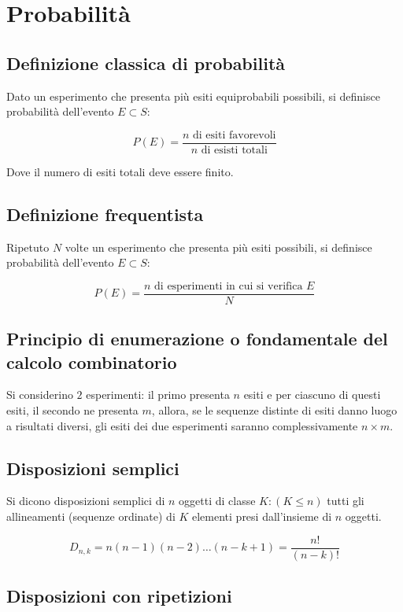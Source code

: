 \documentclass{article}
\begin{document}
\section{Probabilità}

\subsection{Definizione classica di probabilità}

Dato un esperimento che presenta più esiti equiprobabili possibili, si definisce probabilità dell'evento $E \subset S$:

$$
P(E) = \frac{n \text{ di esiti favorevoli}}{n \text{ di esisti totali}}
$$

\noindent
Dove il numero di esiti totali deve essere finito.

\subsection{Definizione frequentista}

Ripetuto $N$ volte un esperimento che presenta più esiti possibili, si definisce probabilità dell'evento $E \subset S$:

$$
P(E) = \frac{n \text{ di esperimenti in cui si verifica } E}{N}
$$

\subsection{Principio di enumerazione o fondamentale del calcolo combinatorio}

Si considerino $2$ esperimenti:
il primo presenta $n$ esiti e per ciascuno di questi esiti,
il secondo ne presenta $m$, allora, se le sequenze distinte di esiti danno luogo a risultati diversi,
gli esiti dei due esperimenti saranno complessivamente $n \times m$.

\subsection{Disposizioni semplici}

Si dicono disposizioni semplici di $n$ oggetti di classe $K : (K \leq n)$ tutti gli allineamenti (sequenze ordinate) di $K$ elementi presi dall'insieme di $n$ oggetti.

$$
D_{n,k} = n(n-1)(n-2)\dots(n-k+1)=\frac{n!}{(n-k)!}
$$

\subsection{Disposizioni con ripetizioni}
\end{document}
